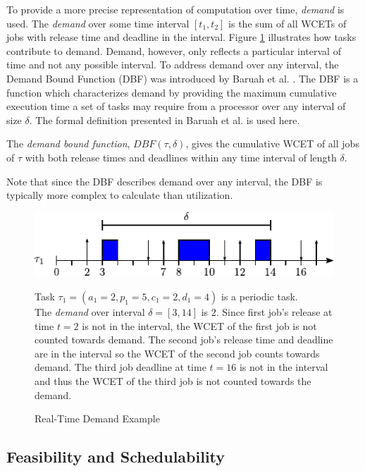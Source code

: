 To provide a more precise representation of computation over time, \textit{demand} is used.
The \textit{demand} over some time interval $[t_1,t_2]$ is the sum of all WCETs of jobs with release time and deadline in the interval.
Figure \ref{fig:rt-demand} illustrates how tasks contribute to demand.
Demand, however, only reflects a particular interval of time and not any possible interval.
To address demand over any interval, the Demand Bound Function (DBF) was introduced by Baruah et al. \cite{baruah_preemptively_1990}.
The DBF is a function which characterizes demand by providing the maximum cumulative execution time a set of tasks may require from a processor over any interval of size $\delta$. 
The formal definition presented in Baruah et al. \cite{baruah_preemptively_1990} is used here.
\begin{definition}\label{def:dbf}
    The \textit{demand bound function}, $DBF(\tau,\delta)$, gives the cumulative WCET of all jobs of $\tau$ with both release times and deadlines within any time interval of length $\delta$.
\end{definition}
Note that since the DBF describes demand over any interval, the DBF is typically more complex to calculate than utilization.

\begin{figure}[!htbp]
    \centering
    \includegraphics[width=0.75\linewidth]{fig/demandExample.pdf}
    \caption{Real-Time Demand Example}
    Task $\tau_1 = (a_1=2, p_1 = 5, c_1=2, d_1=4)$ is a periodic task.\\
    The \textit{demand} over interval $\delta = [3,14]$ is $2$.
    Since first job's release at time $t=2$ is not in the interval, the WCET of the first job is not counted towards demand.
    The second job's release time and deadline are in the interval so the WCET of the second job counts towards demand.
    The third job deadline at time $t=16$ is not in the interval and thus the WCET of the third job is not counted towards the demand.
    \label{fig:rt-demand}
\end{figure}

\subsection{Feasibility and Schedulability}

